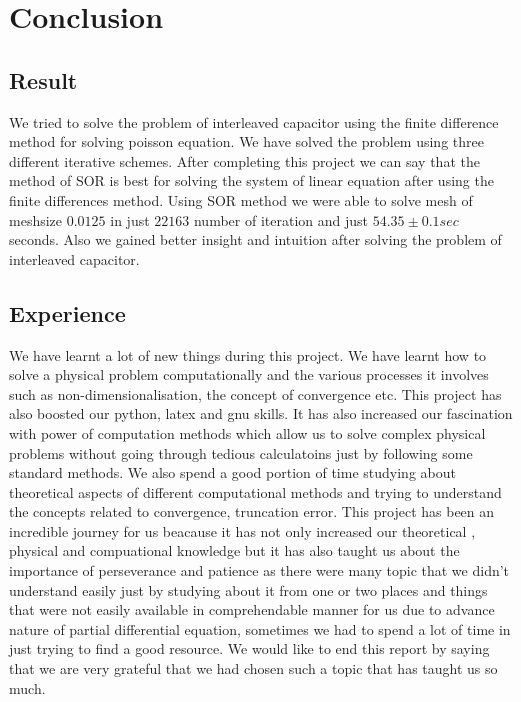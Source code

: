\section{Conclusion}
\subsection{Result}
We tried to solve the problem of interleaved capacitor using the finite difference method for solving poisson equation. We have solved the problem using three different iterative schemes. After completing this project we can say that the method of SOR is best for solving the system of linear equation after using the finite differences method. Using SOR method we were able to solve mesh of meshsize $ 0.0125 $ in just $ 22163 $ number of iteration and just $  54.35 \pm 0.1 sec $ seconds. Also we gained better insight and intuition after solving the problem of interleaved capacitor.
\subsection{Experience}
We have learnt a lot of new things during this project. We have learnt  how to solve a physical problem computationally and the various processes  it  involves such as non-dimensionalisation, the concept of convergence etc. This project has also boosted our python, latex and gnu skills. It has also increased our fascination with power of computation methods which allow us to solve complex physical problems without going through tedious calculatoins just by following some standard methods. 
 We also spend a good portion of time studying about theoretical aspects of different computational methods and trying to understand the concepts related to convergence, truncation error. This project has been an incredible journey for us beacause it has not only increased our theoretical , physical and compuational knowledge but it has also taught us about the importance of perseverance and patience as there were many topic  that we didn't understand easily just by studying about it from one or two places and  things that were not easily available in comprehendable manner for us due to advance nature of partial differential equation, sometimes we had to spend a lot of time in just trying to find a good resource. We would like to end this report by saying that we are very grateful that we had chosen such a topic that has taught us so much. 

